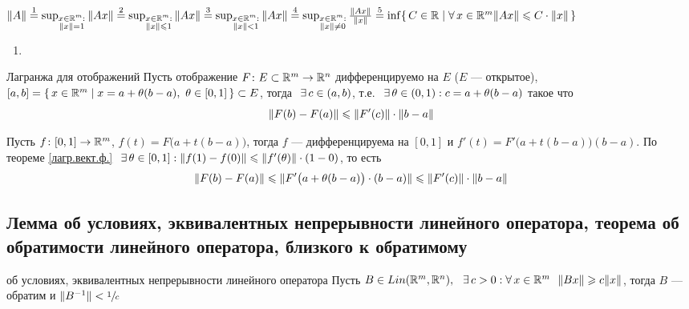 \begin{zam}[https://youtu.be/OazzLm0DJN4?si=gixxNia3dTgatT7R&t=3022]
	$\|A\| \stackrel{1}{=} \sup_{\substack{x \in \rmm: \\ \|x\| = 1}}\|Ax\|
	\stackrel{2}{=} \sup_{\substack{x \in \rmm: \\ \|x\| \< 1}}\|Ax\| 
	\stackrel{3}{=} \sup_{\substack{x \in \rmm: \\ \|x\| < 1}}\|Ax\| 
	\stackrel{4}{=} \sup_{\substack{x \in \rmm: \\ \|x\| \ne 0}} \frac{\|Ax\|}{\|x\|} \medskip 
	\stackrel{5}{=} \inf\{\,C\in \rr \mid \A x \in \rmm \|Ax\| \< C \cdot \|x\|\,\}$ 
	\begin{enumerate}
		\item
	\end{enumerate}
\end{zam}

\begin{teor}[https://youtu.be/OazzLm0DJN4?si=JvVhDSiKtEYa2cTH&t=3281]{Лагранжа для отображений}\label{теор.лагрнж.для отобр.}
	Пусть отображение $F \colon E \subset \mathbb R^m \to \mathbb R^n$ дифференцируемо на $E$ ($E$ --- открытое), $[a, b] = \{\, x \in \rmm \mid \linebreak x = a + \theta (b - a),\ \theta \in [0, 1]\,\} \subset E$, тогда$\E c \in (a, b)$, т.е.$\E \theta \in (0, 1) : c = a + \theta(b - a)$ такое что
	\[\|F(b) - F(a)\| \leqslant \|F'(c)\| \cdot \|b - a\|\] 
\end{teor}           

\begin{prf}
	Пусть $f \colon [0, 1] \to \mathbb R^m$, $f(t) = F\bigl(a + t(b - a)\bigr)$, тогда $f$ --- дифференцируема \smallskip на $[0, 1]$ и $f'(t) = F'\bigl(a + t(b-a)\bigr)(b - a)$. По теореме \ref{лагр.вект.ф.}$\hspace{7pt plus 1pt minus 2pt} \exists \, \theta \in [0, 1] : \|f(1) - f(0)\| \leqslant \|f'(\theta)\| \cdot (1 - 0)$, {то есть\linebreak} \[\|F(b) - F(a)\| \leqslant \|F'\bigl(a + \theta(b - a)\bigr)\cdot (b - a)\| \leqslant \|F'(c)\|\cdot\|b - a\| \] 
\end{prf}

\subsection{Лемма об условиях, эквивалентных непрерывности линейного оператора, теорема об обратимости линейного оператора, близкого к обратимому}
\begin{lem}[https://youtu.be/OazzLm0DJN4?si=OJoKFMQENlqrOntk&t=3846]{об условиях, эквивалентных непрерывности линейного оператора}\label{лем.усл.экв.непр.лин.оп.}
	Пусть $B \in Lin(\mathbb R^m, \mathbb R^n), \hspace{7pt plus 1pt minus 2pt} \exists \, c > 0 : \forall \, x \in \mathbb R^m\ \ \|Bx\| \geqslant c\|x\|$, тогда $B$ --- обратим и $\|B^{-1}\|< \sfrac{1}{c}$
\end{lem}
	
